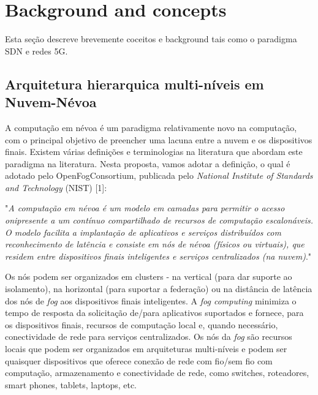 \clearpage
\section{Background and concepts}
\label{ch:background}

Esta seção descreve brevemente coceitos e background tais como o paradigma SDN e redes 5G.

\subsection{Arquitetura hierarquica multi-níveis em Nuvem-Névoa}

A computação em névoa é um paradigma relativamente novo na computação, com o principal objetivo de preencher uma lacuna entre a nuvem e os dispositivos finais. Existem várias definições e terminologias na literatura que abordam este paradigma na literatura. Nesta proposta, vamos adotar a definição, o qual é adotado pelo OpenFogConsortium, publicada pelo \textit{National Institute of Standards and Technology} (NIST) [1]: 

\begin{displayquote}

"\textit{A computação em névoa é um modelo em camadas para permitir o acesso onipresente a um contínuo compartilhado de recursos de computação escalonáveis. O modelo facilita a implantação de aplicativos e serviços distribuídos com reconhecimento de latência e consiste em nós de névoa (físicos ou virtuais), que residem entre dispositivos finais inteligentes e serviços centralizados (na nuvem)}."

\end{displayquote}

Os nós podem ser organizados em clusters - na vertical (para dar suporte ao isolamento), na horizontal (para suportar a federação) ou na distância de latência dos nós de \textit{fog} aos dispositivos finais inteligentes. A \textit{fog computing} minimiza o tempo de resposta da solicitação de/para aplicativos suportados e fornece, para os dispositivos finais, recursos de computação local e, quando necessário, conectividade de rede para serviços centralizados. Os nós da \textit{fog} são recursos locais que podem ser organizados em arquiteturas multi-níveis e podem ser quaisquer dispositivos que oferece conexão de rede com fio/sem fio com computação, armazenamento e conectividade de rede, como switches, roteadores, smart phones, tablets, laptops, etc. 

